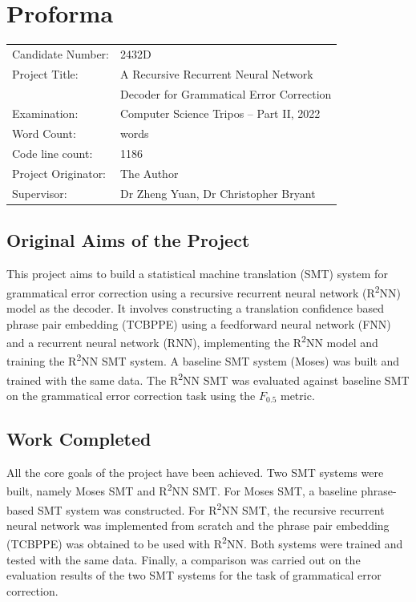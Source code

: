 \documentclass[12pt,a4paper,twoside]{report}
\newcommand{\quickwordcount}[1]{%
  \immediate\write18{texcount -1 -sum -merge -q #1.tex output.bbl > #1-words.sum }%
   words%
}
\begin{document}
\chapter*{Proforma}

{\large
\begin{tabular}{ll}
Candidate Number:   & 2432D \\
Project Title:      & A Recursive Recurrent Neural Network \\
 & Decoder for Grammatical Error Correction \\
Examination:        & Computer Science Tripos -- Part II, 2022  \\
Word Count:         & \quickwordcount{diss}\footnotemark[1] \\
Code line count:    & 1186 \footnotemark[2]\\
Project Originator: & The Author \\
Supervisor:         & Dr Zheng Yuan, Dr Christopher Bryant
\end{tabular}
}


\section*{Original Aims of the Project}
This project aims to build a statistical machine translation (SMT) system for grammatical error correction using a recursive recurrent neural network (R\textsuperscript{2}NN) model as the decoder. It involves constructing a translation confidence based phrase pair embedding (TCBPPE) using a feedforward neural network (FNN) and a recurrent neural network (RNN), implementing the R\textsuperscript{2}NN model and training the R\textsuperscript{2}NN SMT system. A baseline SMT system (Moses) was built and trained with the same data. The R\textsuperscript{2}NN SMT was evaluated against baseline SMT on the grammatical error correction task using the $F_{0.5}$ metric.

\section*{Work Completed}
All the core goals of the project have been achieved. Two SMT systems were built, namely Moses SMT and R\textsuperscript{2}NN SMT. For Moses SMT, a baseline phrase-based SMT system was constructed. For R\textsuperscript{2}NN SMT, the recursive recurrent neural network was implemented from scratch and the phrase pair embedding (TCBPPE) was obtained to be used with R\textsuperscript{2}NN. Both systems were trained and tested with the same data. Finally, a comparison was carried out on the evaluation results of the two SMT systems for the task of grammatical error correction.
\end{document}
